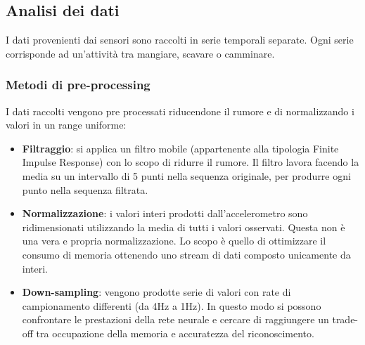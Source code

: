 \documentclass[12pt]{article}
\begin{document}
 		\subsection{Analisi dei dati}
 			I dati provenienti dai sensori sono raccolti in serie temporali separate. Ogni serie corrisponde ad un'attività tra mangiare, scavare o camminare. 
 			\subsubsection{Metodi di pre-processing}
 				I dati raccolti vengono pre processati riducendone il rumore e di normalizzando i valori in un range uniforme:
 				\begin{itemize}
 					\item \textbf{Filtraggio}: si applica un filtro mobile (appartenente alla tipologia Finite Impulse Response) con lo scopo di ridurre il rumore. Il filtro lavora facendo la media su un intervallo di 5 punti nella sequenza originale, per produrre ogni punto nella sequenza filtrata.
 					\item \textbf{Normalizzazione}: i valori interi prodotti dall'accelerometro sono ridimensionati utilizzando la media di tutti i valori osservati. Questa non è una vera e propria normalizzazione. Lo scopo è quello di ottimizzare il consumo di memoria ottenendo uno stream di dati composto unicamente da interi.
 					\item \textbf{Down-sampling}: vengono prodotte serie di valori con rate di campionamento differenti (da 4Hz a 1Hz). In questo modo si possono confrontare le prestazioni della rete neurale e cercare di raggiungere un trade-off tra occupazione della memoria e accuratezza del riconoscimento.
 				\end{itemize}
\end{document}

